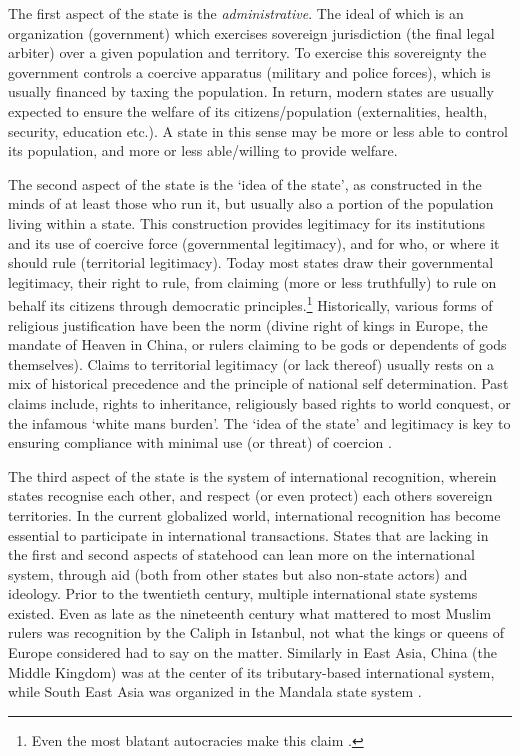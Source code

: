 The first aspect of the state is the \textit{administrative}. The ideal of
which is an organization (government) which exercises sovereign jurisdiction
(the final legal arbiter) over a given population and territory. To exercise
this sovereignty the government controls a coercive apparatus (military and
police forces), which is usually financed by taxing the population. In return,
modern states are usually expected to ensure the welfare of its
citizens/population (externalities, health, security, education etc.). A state
in this sense may be more or less able to control its population, and more or
less able/willing to provide welfare.

The second aspect of the state is the `idea of the state', as constructed in the
minds of at least those who run it, but usually also a portion of the population
living within a state. This construction provides legitimacy for its
institutions and its use of coercive force (governmental legitimacy), and for
who, or where it should rule (territorial legitimacy). Today most states draw
their governmental legitimacy, their right to rule, from claiming (more or less
truthfully) to rule on behalf its citizens through democratic
principles.\footnote{Even the most blatant autocracies make this claim
\citep{FukuyamaFrancis2014POaP}.} Historically, various forms of religious
justification have been the norm (divine right of kings in Europe, the mandate
of Heaven in China, or rulers claiming to be gods or dependents of gods
themselves). Claims to territorial legitimacy (or lack thereof) usually rests on
a mix of historical precedence and the principle of national self determination.
Past claims include, rights to inheritance, religiously based rights to world
conquest, or the infamous `white mans burden'. The `idea of the state' and
legitimacy is key to ensuring compliance with minimal use (or threat) of
coercion \citep{BuzanBarry2007PSaF}. 

The third aspect of the state is the system of international recognition,
wherein states recognise each other, and respect (or even protect) each others
sovereign territories. In the current globalized world, international
recognition has become essential to participate in international transactions.
States that are lacking in the first and second aspects of statehood can lean
more on the international system, through aid (both from other states but also
non-state actors) and ideology. Prior to the twentieth century, multiple
international state systems existed. Even as late as the nineteenth century what
mattered to most Muslim rulers was recognition by the Caliph in Istanbul, not
what the kings or queens of Europe considered had to say on the matter.
Similarly in East Asia, China (the Middle Kingdom) was at the center of its
tributary-based international system, while South East Asia was organized in the
Mandala state system \citep{Hui_2005, KangDavidC2010EAbt}.

